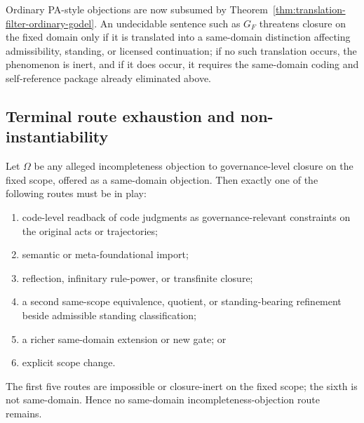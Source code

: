 \begin{remark}
Ordinary PA-style objections are now subsumed by Theorem~\ref{thm:translation-filter-ordinary-godel}. An undecidable sentence such as $G_F$ threatens closure on the fixed domain only if it is translated into a same-domain distinction affecting admissibility, standing, or licensed continuation; if no such translation occurs, the phenomenon is inert, and if it does occur, it requires the same-domain coding and self-reference package already eliminated above.
\end{remark}

\subsection{Terminal route exhaustion and non-instantiability}

\begin{theorem}
\label{thm:incompleteness-route-exhaustion}
Let $\Omega$ be any alleged incompleteness objection to governance-level closure on the fixed scope, offered as a same-domain objection. Then exactly one of the following routes must be in play:
\begin{enumerate}
  \item code-level readback of code judgments as governance-relevant constraints on the original acts or trajectories;
  \item semantic or meta-foundational import;
  \item reflection, infinitary rule-power, or transfinite closure;
  \item a second same-scope equivalence, quotient, or standing-bearing refinement beside admissible standing classification;
  \item a richer same-domain extension or new gate; or
  \item explicit scope change.
\end{enumerate}
The first five routes are impossible or closure-inert on the fixed scope; the sixth is not same-domain. Hence no same-domain incompleteness-objection route remains.
\end{theorem}

